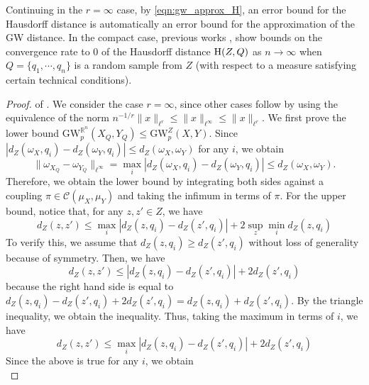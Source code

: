 \documentclass[twoside,11pt]{article}
\theoremstyle{definition}
\newcommand{\dgwz}{\mathrm{GW}_p^Z}
\newcommand{\dgwRn}{\mathrm{GW}_p^{\mathbb{R}^n}}
\begin{document}
\begin{remark}
\smallskip
{}
Continuing in the $r=\infty$ case, by \eqref{eqn:gw_approx_H}, an error bound for the Hausdorff distance is automatically an error bound for the approximation of the GW distance.
In the compact case, previous works \citep[Theorem 34]{JMLR:v11:carlsson10a}, \citep[Theorem 2]{pmlr-v32-chazal14} show bounds on the convergence rate to 0 of the Hausdorff distance $\textnormal{H}(Z, Q)$ as $n\to\infty$ when $Q=\{q_1,\cdots, q_n\}$ is a random sample from $Z$ (with respect to a measure satisfying certain technical conditions).
\end{remark}




\begin{proof}of .
    We consider the case $r=\infty$, since other cases follow by using the equivalence of the norm $n^{-1/r}\|x\|_{\ell^r}\leq \|x\|_{\ell^{\infty}} \leq \|x\|_{\ell^r}$. We first prove the lower bound $\dgwRn(X_{Q},Y_{Q}) \leq \dgwz(X, Y)$. Since $|d_Z(\omega_X,q_i)-d_Z(\omega_Y,q_i)|\leq d_Z(\omega_X,\omega_Y)$ for any $i$, we obtain 
    \[
    \|\omega_{X_Q}-\omega_{Y_Q}\|_{\ell^{\infty}} = \max_{i}|d_Z(\omega_X,q_i)-d_Z(\omega_Y,q_i)|\leq d_Z(\omega_X,\omega_Y).
    \]
    Therefore, we obtain the lower bound by integrating both sides against a coupling $\pi\in\mathcal{C}(\mu_X,\mu_Y)$ and taking the infimum in terms of $\pi$. For the upper bound, notice that, for any $z,z'\in Z$, we have  
    \begin{equation}
        d_Z(z,z') \leq \max_{i}|d_Z(z, q_i)-d_Z(z',q_i)| + 2\sup_{z}\min_{i}d_Z(z,q_i)
    \end{equation}
    To verify this, we assume that $d_Z(z,q_i)\geq d_Z(z',q_i)$ without loss of generality because of symmetry. Then, we have
    \begin{equation}
        \label{eqn:ZGWapprox_intermediate}
        d_Z(z,z') \leq |d_Z(z, q_i)-d_Z(z',q_i)| + 2d_Z(z',q_i)
    \end{equation}
    because the right hand side is equal to $d_Z(z,q_i)-d_Z(z',q_i)+2d_Z(z',q_i) = d_Z(z,q_i)+d_Z(z',q_i)$. By the triangle inequality, we obtain the inequality. Thus, taking the maximum in terms of $i$, we have
    \begin{equation}
        d_Z(z,z') \leq \max_{i}|d_Z(z, q_i)-d_Z(z',q_i)| + 2d_Z(z',q_i)
    \end{equation}
    Since the above is true for any $i$, we obtain
    \begin{equation}

\end{equation}
\end{proof}
\end{document}
